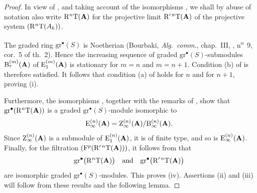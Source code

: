 \begin{proof}
In view of , and taking account of the
isomorphisms , we shall by abuse of notation also
write $\mathrm{R}^n\mathrm{T}(\mathbf{A})$ for the projective limit
$\mathrm{R}'^{\,n}\mathrm{T}(\mathbf{A})$ of the projective system
$(\mathrm{R}^n\mathrm{T}(A_k))$.

The graded ring $\mathrm{gr}^\bullet(S)$ is Noetherian
(Bourbaki, \emph{Alg.\ comm.}, chap.~III, ,
n\textsuperscript{o}~9, cor.~5 of th.~2).
Hence the increasing sequence of graded
$\mathrm{gr}^\bullet(S)$-submodules
$\mathrm{B}_r^{(m)}(\mathbf{A})$ of
$\mathrm{E}_1^{(m)}(\mathbf{A})$ is stationary for $m=n$ and
$m=n+1$.
Condition {\rm(b)} of  is therefore satisfied.
It follows that condition {\rm(a)} of  holds for
$n$ and for $n+1$, proving {\rm(i)}.

Furthermore, the isomorphisms , together with the
remarks of , show that
$\mathrm{gr}^\bullet(\mathrm{R}^n\mathrm{T}(\mathbf{A}))$ is a graded
$\mathrm{gr}^\bullet(S)$-module isomorphic to
\[
  \mathrm{E}_\infty^{(n)}(\mathbf{A})
  =
  \mathrm{Z}_\infty^{(n)}(\mathbf{A})
  /
  \mathrm{B}_\infty^{(n)}(\mathbf{A}).
\]
Since $\mathrm{Z}_\infty^{(n)}(\mathbf{A})$ is a submodule of
$\mathrm{E}_1^{(n)}(\mathbf{A})$, it is of finite type, and so is
$\mathrm{E}_\infty^{(n)}(\mathbf{A})$.
Finally, for the filtration
$(\mathrm{F}^p(\mathrm{R}'^{\,n}\mathrm{T}(\mathbf{A})))$, it follows from
 that
\[
  \mathrm{gr}^\bullet\bigl(\mathrm{R}^n\mathrm{T}(\mathbf{A})\bigr)
  \quad\hbox{and}\quad
  \mathrm{gr}^\bullet\bigl(\mathrm{R}'^{\,n}\mathrm{T}(\mathbf{A})\bigr)
\]
are isomorphic graded $\mathrm{gr}^\bullet(S)$-modules.
This proves {\rm(iv)}.
Assertions {\rm(ii)} and {\rm(iii)} will follow from these results
and the following lemma.
\end{proof}

